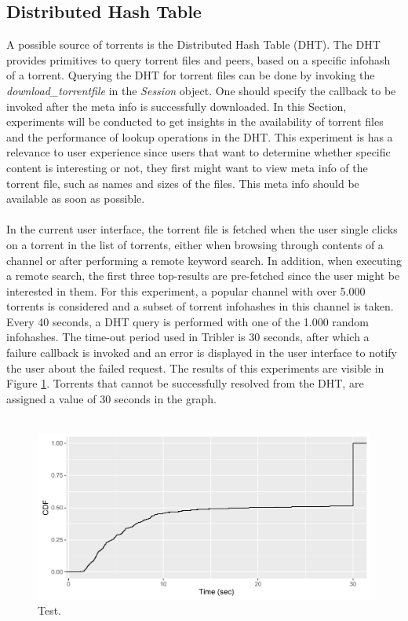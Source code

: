 \subsection{Distributed Hash Table}
A possible source of torrents is the Distributed Hash Table (DHT). The DHT provides primitives to query torrent files and peers, based on a specific infohash of a torrent. Querying the DHT for torrent files can be done by invoking the \emph{download\_torrentfile} in the \emph{Session} object. One should specify the callback to be invoked after the meta info is successfully downloaded. In this Section, experiments will be conducted to get insights in the availability of torrent files and the performance of lookup operations in the DHT. This experiment is has a relevance to user experience since users that want to determine whether specific content is interesting or not, they first might want to view meta info of the torrent file, such as names and sizes of the files. This meta info should be available as soon as possible.\\\\
In the current user interface, the torrent file is fetched when the user single clicks on a torrent in the list of torrents, either when browsing through contents of a channel or after performing a remote keyword search. In addition, when executing a remote search, the first three top-results are pre-fetched since the user might be interested in them. For this experiment, a popular channel with over 5.000 torrents is considered and a subset of torrent infohashes in this channel is taken. Every 40 seconds, a DHT query is performed with one of the 1.000 random infohashes. The time-out period used in Tribler is 30 seconds, after which a failure callback is invoked and an error is displayed in the user interface to notify the user about the failed request. The results of this experiments are visible in Figure \ref{fig:metainfo_fetch}. Torrents that cannot be successfully resolved from the DHT, are assigned a value of 30 seconds in the graph.\\\\

\begin{figure}[!h]
	\centering
	\includegraphics[width=0.9\columnwidth]{images/experiments/metainfo_fetch}
	\caption{Test.}
	\label{fig:metainfo_fetch}
\end{figure}

